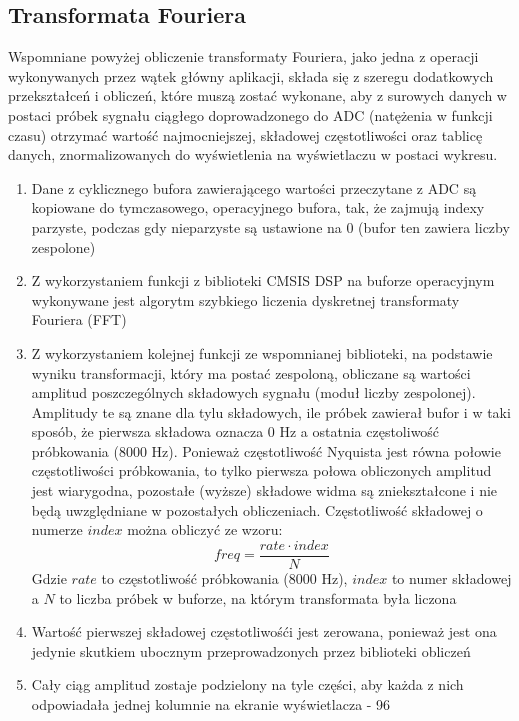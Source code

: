 \subsection{Transformata Fouriera}
Wspomniane powyżej obliczenie transformaty Fouriera, jako jedna z operacji wykonywanych przez wątek główny aplikacji, składa się z szeregu dodatkowych przekształceń i obliczeń, które muszą zostać wykonane, aby z surowych danych w postaci próbek sygnału ciągłego doprowadzonego do ADC (natężenia w funkcji czasu) otrzymać wartość najmocniejszej, składowej częstotliwości oraz tablicę danych, znormalizowanych do wyświetlenia na wyświetlaczu w postaci wykresu.
\begin{enumerate}
    \item Dane z cyklicznego bufora zawierającego wartości przeczytane z ADC są kopiowane do tymczasowego, operacyjnego bufora, tak, że zajmują indexy parzyste, podczas gdy nieparzyste są ustawione na 0 (bufor ten zawiera liczby zespolone)
    \item Z wykorzystaniem funkcji z biblioteki CMSIS DSP na buforze operacyjnym wykonywane jest algorytm szybkiego liczenia dyskretnej transformaty Fouriera (FFT)
    \item Z wykorzystaniem kolejnej funkcji ze wspomnianej biblioteki, na podstawie wyniku transformacji, który ma postać zespoloną, obliczane są wartości amplitud poszczególnych składowych sygnału (moduł liczby zespolonej). Amplitudy te są znane dla tylu składowych, ile próbek zawierał bufor i w taki sposób, że pierwsza składowa oznacza 0 Hz a ostatnia częstoliwość próbkowania (8000 Hz). Ponieważ częstotliwość Nyquista jest równa połowie częstotliwości próbkowania, to tylko pierwsza połowa obliczonych amplitud jest wiarygodna, pozostałe (wyższe) składowe widma są zniekształcone i nie będą uwzględniane w pozostałych obliczeniach. Częstotliwość składowej o numerze $index$ można obliczyć ze wzoru:
        \begin{equation}
            freq = \frac{rate \cdot index}{N}  \label{fft_freq}
        \end{equation}
        Gdzie $rate$ to częstotliwość próbkowania (8000 Hz), $index$ to numer składowej a $N$ to liczba próbek w buforze, na którym transformata była liczona
    \item Wartość pierwszej składowej częstotliwośći jest zerowana, ponieważ jest ona jedynie skutkiem ubocznym przeprowadzonych przez biblioteki obliczeń
    \item Cały ciąg amplitud zostaje podzielony na tyle części, aby każda z nich odpowiadała jednej kolumnie na ekranie wyświetlacza - 96

\end{enumerate}
